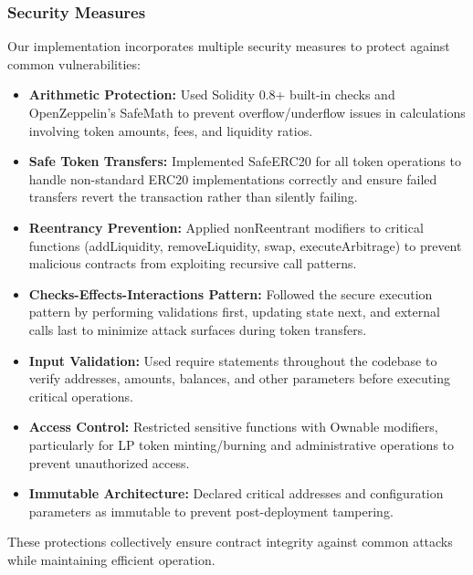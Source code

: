 \documentclass[12pt]{article}
\begin{document}
\subsubsection{Security Measures}
Our implementation incorporates multiple security measures to protect against common  vulnerabilities:
\begin{itemize}
    \item \textbf{Arithmetic Protection:} Used Solidity 0.8+ built-in checks and OpenZeppelin's SafeMath to prevent overflow/underflow issues in calculations involving token amounts, fees, and liquidity ratios.

    \item \textbf{Safe Token Transfers:} Implemented SafeERC20 for all token operations to handle non-standard ERC20 implementations correctly and ensure failed transfers revert the transaction rather than silently failing.

    \item \textbf{Reentrancy Prevention:} Applied nonReentrant modifiers to critical functions (addLiquidity, removeLiquidity, swap, executeArbitrage) to prevent malicious contracts from exploiting recursive call patterns.

    \item \textbf{Checks-Effects-Interactions Pattern:} Followed the secure execution pattern by performing validations first, updating state next, and external calls last to minimize attack surfaces during token transfers.

    \item \textbf{Input Validation:} Used require statements throughout the codebase to verify addresses, amounts, balances, and other parameters before executing critical operations.

    \item \textbf{Access Control:} Restricted sensitive functions with Ownable modifiers, particularly for LP token minting/burning and administrative operations to prevent unauthorized access.

    \item \textbf{Immutable Architecture:} Declared critical addresses and configuration parameters as immutable to prevent post-deployment tampering.
\end{itemize}
These protections collectively ensure contract integrity against common attacks while maintaining efficient operation.
\end{document}
